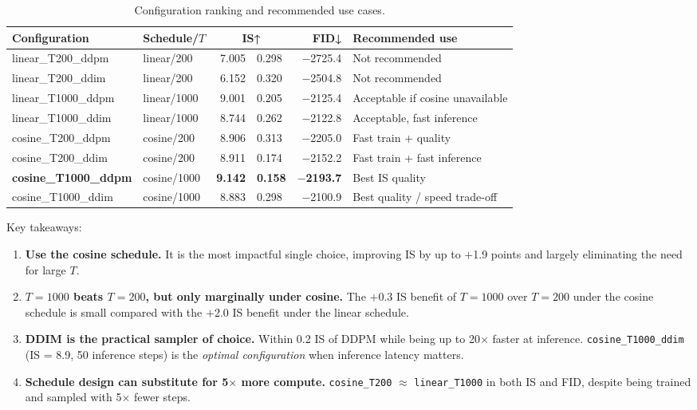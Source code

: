 \documentclass[11pt,a4paper]{article}
\begin{document}
\begin{table}[H]
\centering
\caption{Configuration ranking and recommended use cases.}
\begin{tabular}{llr@{$\,\pm\,$}lrl}
\toprule
\textbf{Configuration} & \textbf{Schedule/$T$} & \multicolumn{2}{c}{\textbf{IS↑}} &
  \textbf{FID↓} & \textbf{Recommended use}\\
\midrule
linear\_T200\_ddpm  & linear/200  & 7.005 & 0.298 & $-$2725.4 & \textcolor{red!60!black}{Not recommended}\\
linear\_T200\_ddim  & linear/200  & 6.152 & 0.320 & $-$2504.8 & \textcolor{red!60!black}{Not recommended}\\
linear\_T1000\_ddpm & linear/1000 & 9.001 & 0.205 & $-$2125.4 & Acceptable if cosine unavailable\\
linear\_T1000\_ddim & linear/1000 & 8.744 & 0.262 & $-$2122.8 & Acceptable, fast inference\\
cosine\_T200\_ddpm  & cosine/200  & 8.906 & 0.313 & $-$2205.0 & \textcolor{green!50!black}{Fast train + quality}\\
cosine\_T200\_ddim  & cosine/200  & 8.911 & 0.174 & $-$2152.2 & \textcolor{green!50!black}{Fast train + fast inference}\\
\textbf{cosine\_T1000\_ddpm} & cosine/1000 & \textbf{9.142} & \textbf{0.158} & \boldmath$-$\textbf{2193.7}
  & \textcolor{green!50!black}{Best IS quality}\\
cosine\_T1000\_ddim & cosine/1000 & 8.883 & 0.298 & $-$2100.9
  & \textcolor{green!50!black}{Best quality / speed trade-off}\\
\bottomrule
\end{tabular}
\end{table}

\noindent Key takeaways:

\begin{enumerate}[leftmargin=1.8em]
  \item \textbf{Use the cosine schedule.} It is the most impactful single
        choice, improving IS by up to $+$1.9 points and largely eliminating
        the need for large $T$.

  \item \textbf{$T=1000$ beats $T=200$, but only marginally under cosine.}
        The $+$0.3 IS benefit of $T=1000$ over $T=200$ under the cosine
        schedule is small compared with the $+$2.0 IS benefit under the
        linear schedule.

  \item \textbf{DDIM is the practical sampler of choice.} Within 0.2 IS
        of DDPM while being up to 20$\times$ faster at inference.
        \texttt{cosine\_T1000\_ddim} (IS = 8.9, 50 inference steps) is the
        \emph{optimal configuration} when inference latency matters.

  \item \textbf{Schedule design can substitute for 5$\times$ more compute.}
        \texttt{cosine\_T200} $\approx$ \texttt{linear\_T1000} in both IS
        and FID, despite being trained and sampled with 5$\times$ fewer steps.
\end{enumerate}
\end{document}
